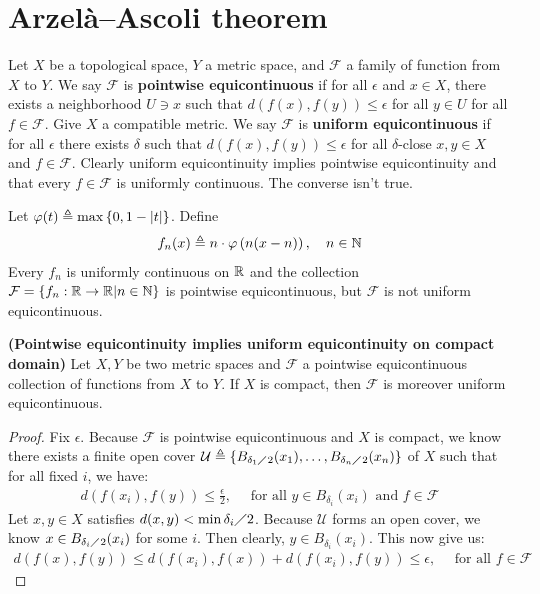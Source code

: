 \documentclass{report}
\begin{document}
\section{Arzelà–Ascoli theorem}
Let $X$ be a topological space,  $Y$ a metric space, and $\mathcal{F}$ a family of function from $X$ to $Y$. We say  $\mathcal{F}$ is \textbf{pointwise equicontinuous} if for all $\epsilon $ and $x \in X$, there exists a neighborhood $U\ni x$ such that $d\left(f(x),f(y) \right)\leq \epsilon $ for all $y \in U$ for all $f \in \mathcal{F}$. Give $X$ a compatible metric. We say $\mathcal{F}$ is \textbf{uniform equicontinuous} if for all $\epsilon $ there exists $\delta$ such that $d \left(f(x),f(y) \right) \leq  \epsilon $ for all $\delta$-close $x,y \in X$ and $f \in \mathcal{F}$. Clearly uniform equicontinuity implies pointwise equicontinuity and that every $f \in \mathcal{F}$ is uniformly continuous. The converse isn't true. 
\begin{example}
Let $\varphi (t)\triangleq \max \left\{ 0, 1- \left|t\right| \right\}$. Define 
\begin{align*}
f_n(x)\triangleq n \cdot \varphi\left( n(x-n) \right) ,\quad n\in\mathbb{N}
\end{align*}
Every $f_n$ is uniformly continuous on $\mathbb{R}$ and the collection $\mathcal{F}=\left\{ f_n: \mathbb{R} \rightarrow \mathbb{R}| n\in\mathbb{N}  \right\}$ is pointwise equicontinuous, but $\mathcal{F}$ is not uniform equicontinuous. 
\end{example}
\begin{theorem}
\textbf{(Pointwise equicontinuity implies uniform equicontinuity on compact domain)} Let $X,Y$ be two metric spaces and $\mathcal{F}$ a pointwise equicontinuous collection of functions from $X$ to $Y$. If $X$ is compact, then $\mathcal{F}$ is moreover uniform equicontinuous. 
\end{theorem}
\begin{proof}
  Fix $\epsilon $. Because  $\mathcal{F}$ is pointwise equicontinuous and $X$ is compact, we know there exists a finite open cover  $\mathcal{U}\triangleq  \left\{ B_{\delta_1 \diagup 2}(x_1),\dots ,B_{ \delta_n \diagup 2}(x_n) \right\}$ of $X$ such that for all fixed $i$, we have: 
\begin{align*}
d\left(f(x_i),f(y) \right)  \leq \frac{\epsilon}{2},\quad \text{ for all }y \in B_{\delta_i}(x_i) \text{ and }f \in \mathcal{F} 
\end{align*}
Let $x,y \in X$ satisfies $d(x,y)< \min \delta_i \diagup 2$. Because $\mathcal{U}$ forms an open cover, we know $x \in B_{\delta_i \diagup 2}(x_i)$ for some $i$. Then clearly, $y \in B_{\delta_i}(x_i)$. This now give us: 
\begin{align*}
d\left(f(x),f(y) \right)\leq d\left(f(x_i),f(x) \right) + d\left(f(x_i),f(y) \right) \leq \epsilon ,\quad \text{ for all }f \in \mathcal{F} 
\end{align*}
\end{proof}
\end{document}
